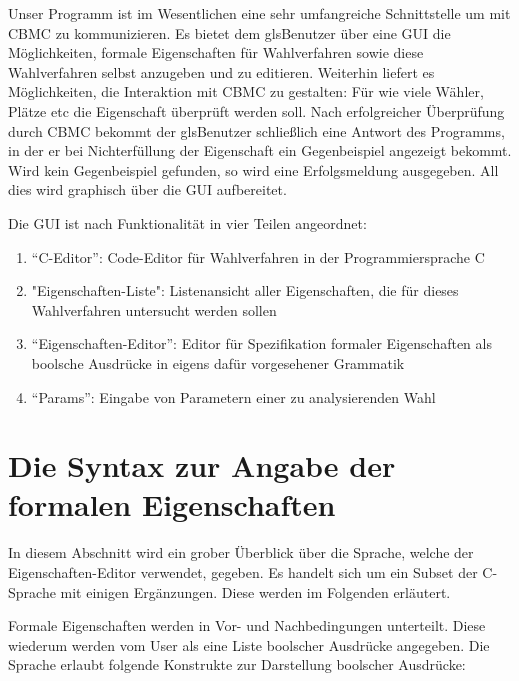 \documentclass[a4paper]{scrreprt}
\begin{document}
Unser Programm ist im Wesentlichen eine sehr umfangreiche Schnittstelle um mit \ac{CBMC} zu kommunizieren. Es bietet dem gls{Benutzer} über eine \ac{GUI} die Möglichkeiten, formale Eigenschaften für Wahlverfahren sowie diese Wahlverfahren selbst anzugeben und zu editieren. Weiterhin liefert es Möglichkeiten, die Interaktion mit \ac{CBMC} zu gestalten: Für wie viele Wähler, Plätze etc die Eigenschaft überprüft werden soll. Nach erfolgreicher Überprüfung durch \ac{CBMC} bekommt der gls{Benutzer} schließlich eine Antwort des Programms, in der er bei Nichterfüllung der Eigenschaft ein Gegenbeispiel angezeigt bekommt. Wird kein Gegenbeispiel gefunden, so wird eine Erfolgsmeldung ausgegeben. All dies wird graphisch über die \ac{GUI} aufbereitet.

Die \ac{GUI} ist nach Funktionalität in vier Teilen angeordnet:
\begin{enumerate}
\item "`C-Editor"': Code-Editor für Wahlverfahren in der Programmiersprache C
\item "Eigenschaften-Liste": Listenansicht aller Eigenschaften, die für dieses Wahlverfahren untersucht werden sollen
\item "`Eigenschaften-Editor"': Editor für Spezifikation formaler Eigenschaften als boolsche Ausdrücke in eigens dafür vorgesehener Grammatik
\item "`Params"': Eingabe von Parametern einer zu analysierenden Wahl
\end{enumerate}

\section{Die Syntax zur Angabe der formalen Eigenschaften} \label{Sprache-für-formale-Eigenschaften}
In diesem Abschnitt wird ein grober Überblick über die Sprache, welche der Eigenschaften-Editor verwendet, gegeben. Es handelt sich um ein Subset der C-Sprache mit einigen Ergänzungen. Diese werden im Folgenden erläutert. 

Formale Eigenschaften werden in Vor- und Nachbedingungen unterteilt. Diese wiederum werden vom User als eine Liste boolscher Ausdrücke angegeben. Die Sprache erlaubt folgende Konstrukte zur Darstellung boolscher Ausdrücke:
\end{document}
